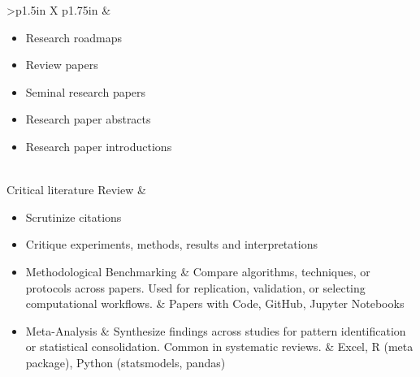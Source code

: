 \documentclass[8pt]{extarticle}
\begin{document}
\begin{tabularx}{\linewidth}{>{\bfseries}p{1.5in} X p{1.75in}}
                                                &   \begin{minipage}[t]{\linewidth}
                                                    \begin{itemize}[nosep,leftmargin=*]
                                                        \item Research roadmaps
                                                        \item Review papers
                                                        \item Seminal research papers
                                                        \item Research paper abstracts
                                                        \item Research paper introductions
                                                    \end{itemize}
                                                    \end{minipage}
                                                            \\
    \addlinespace
    Critical literature Review  &   \begin{minipage}[t]{\linewidth}
                                    \begin{itemize}[nosep]
                                        \item Scrutinize citations
                                        \item Critique experiments, methods, results and interpretations
                                        \item Methodological Benchmarking \& Compare algorithms, techniques, or protocols across papers. Used for replication, validation, or selecting computational workflows. \& Papers with Code, GitHub, Jupyter Notebooks
                                        \item Meta-Analysis \& Synthesize findings across studies for pattern identification or statistical consolidation. Common in systematic reviews. \& Excel, R (meta package), Python (statsmodels, pandas)
                                    \end{itemize}
                                    \end{minipage}


\end{tabularx}
\end{document}
